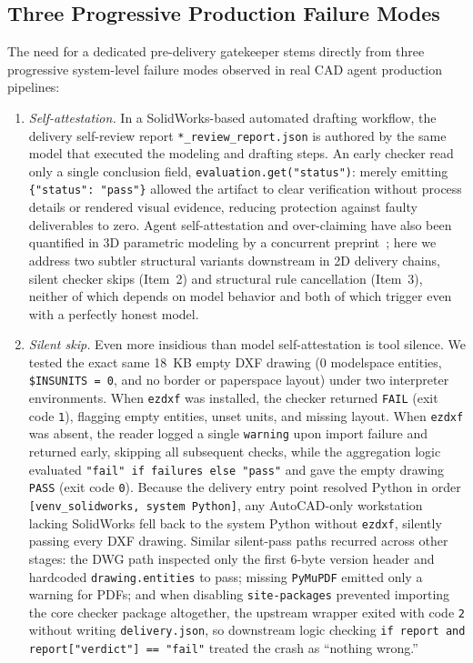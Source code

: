 \documentclass[nocopyright,nolists,upint,varvw,hyphenate]{asmejour}
\begin{document}
\subsection{Three Progressive Production Failure Modes}\label{sec:failure_modes}

The need for a dedicated pre-delivery gatekeeper stems directly from three progressive system-level failure modes observed in real CAD agent production pipelines:

\begin{enumerate}
\item \emph{Self-attestation.} In a SolidWorks-based automated drafting workflow, the delivery self-review report \texttt{*\_review\_report.json} is authored by the same model that executed the modeling and drafting steps. An early checker read only a single conclusion field, \texttt{evaluation.get("status")}: merely emitting \texttt{\{"status": "pass"\}} allowed the artifact to clear verification without process details or rendered visual evidence, reducing protection against faulty deliverables to zero. Agent self-attestation and over-claiming have also been quantified in 3D parametric modeling by a concurrent preprint~\cite{rodrigues2026done}; here we address two subtler structural variants downstream in 2D delivery chains, silent checker skips (Item~2) and structural rule cancellation (Item~3), neither of which depends on model behavior and both of which trigger even with a perfectly honest model.

\item \emph{Silent skip.} Even more insidious than model self-attestation is tool silence. We tested the exact same 18~KB empty DXF drawing (0 modelspace entities, \texttt{\$INSUNITS = 0}, and no border or paperspace layout) under two interpreter environments. When \texttt{ezdxf} was installed, the checker returned \texttt{FAIL} (exit code \texttt{1}), flagging empty entities, unset units, and missing layout. When \texttt{ezdxf} was absent, the reader logged a single \texttt{warning} upon import failure and returned early, skipping all subsequent checks, while the aggregation logic evaluated \texttt{"fail" if failures else "pass"} and gave the empty drawing \texttt{PASS} (exit code \texttt{0}). Because the delivery entry point resolved Python in order \texttt{[venv\_solidworks, system Python]}, any AutoCAD-only workstation lacking SolidWorks fell back to the system Python without \texttt{ezdxf}, silently passing every DXF drawing. Similar silent-pass paths recurred across other stages: the DWG path inspected only the first 6-byte version header and hardcoded \texttt{drawing.entities} to pass; missing \texttt{PyMuPDF} emitted only a warning for PDFs; and when disabling \texttt{site-packages} prevented importing the core checker package altogether, the upstream wrapper exited with code \texttt{2} without writing \texttt{delivery.json}, so downstream logic checking \texttt{if report and report["verdict"] == "fail"} treated the crash as ``nothing wrong.''


\end{enumerate}
\end{document}
